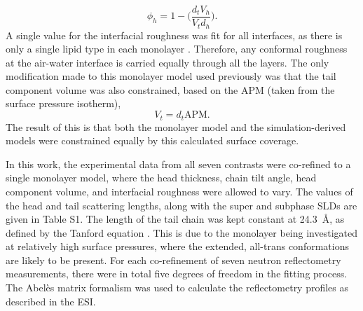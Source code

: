 \documentclass[amsmath,amssymb,twocolumn,superscriptaddress,aps,prl]{revtex4-1}
\begin{document}
%
\begin{equation}
  \phi_h = 1 - \bigg(\frac{d_tV_h}{V_td_h}\bigg).
\end{equation}
%
A single value for the interfacial roughness was fit for all interfaces, as there is only a single lipid type in each monolayer \cite{Campbell2018}.
Therefore, any conformal roughness at the air-water interface is carried equally through all the layers.
The only modification made to this monolayer model used previously was that the tail component volume was also constrained, based on the APM (taken from the surface pressure isotherm),
%
\begin{equation}
  V_t = d_t \text{APM}.
\end{equation}
%
The result of this is that both the monolayer model and the simulation-derived models were constrained equally by this calculated surface coverage.

In this work, the experimental data from all seven contrasts were co-refined to a single monolayer model, where the head thickness, chain tilt angle, head component volume, and interfacial roughness were allowed to vary.
The values of the head and tail scattering lengths, along with the super and subphase SLDs are given in Table S1.
The length of the tail chain was kept constant at \SI{24.3}{\angstrom}, as defined by the Tanford equation \cite{Tanford1980}.
This is due to the monolayer being investigated at relatively high surface pressures, where the extended, all-trans conformations are likely to be present.
For each co-refinement of seven neutron reflectometry measurements, there were in total five degrees of freedom in the fitting process.
The Abel\`{e}s matrix formalism was used to calculate the reflectometry profiles as described in the ESI.
\end{document}
